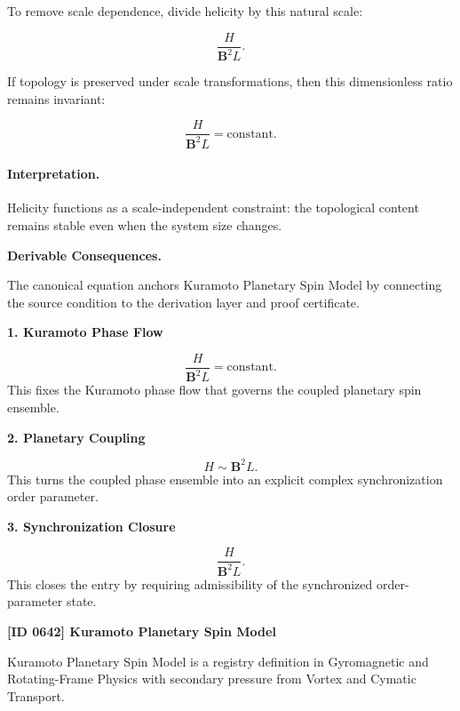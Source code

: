 To remove scale dependence, divide helicity by this natural scale:

\begin{equation}
\frac{H}{\mathbf{B}^2L}.
\end{equation}

If topology is preserved under scale transformations, then this dimensionless ratio remains invariant:

\begin{equation}
\boxed{
\frac{H}{\mathbf{B}^2 L}
=
\mathrm{constant}.
}
\end{equation}

\paragraph{Interpretation.}
Helicity functions as a scale-independent constraint: the topological content remains stable even when the system size changes.

\par\vspace{0.35em}
\noindent\textbf{Derivable Consequences.}\quad
\begingroup
\footnotesize
\raggedright
The canonical equation anchors Kuramoto Planetary Spin Model by connecting the source condition to the derivation layer and proof certificate.
\par\endgroup

\noindent\textbf{1. Kuramoto Phase Flow}\par
\[
\frac{H}{\mathbf{B}^2 L} = \mathrm{constant}.
\]
\noindent This fixes the Kuramoto phase flow that governs the coupled planetary spin ensemble.\par
\noindent\textbf{2. Planetary Coupling}\par
\[
H \sim \mathbf{B}^2 L.
\]
\noindent This turns the coupled phase ensemble into an explicit complex synchronization order parameter.\par
\noindent\textbf{3. Synchronization Closure}\par
\[
\frac{H}{\mathbf{B}^2L}.
\]
\noindent This closes the entry by requiring admissibility of the synchronized order-parameter state.\par

\clearpage
\noindent\textbf{[ID 0642] Kuramoto Planetary Spin Model}\par
\vspace{0.35em}
\begingroup\small
{}
Kuramoto Planetary Spin Model is a registry definition in Gyromagnetic and Rotating-Frame Physics with secondary pressure from Vortex and Cymatic Transport.

